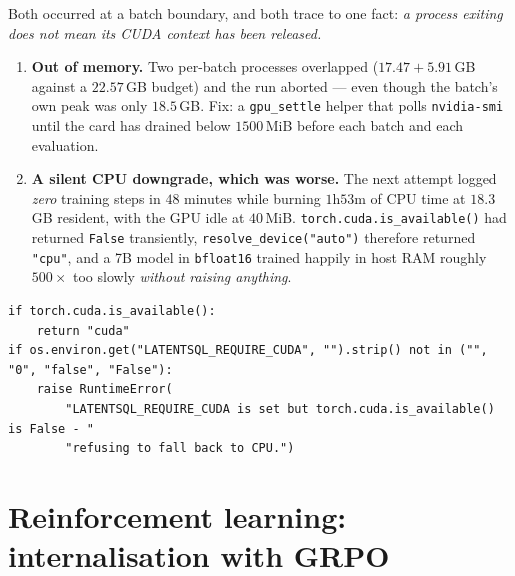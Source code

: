 \documentclass[11pt]{article}
\theoremstyle{definition}
\begin{document}
Both occurred at a batch boundary, and both trace to one fact: \emph{a process exiting does not mean its CUDA context has been released.}

\begin{enumerate}
\item \textbf{Out of memory.} Two per-batch processes overlapped ($17.47 + 5.91$\,GB against a $22.57$\,GB budget) and the run aborted --- even though the batch's own peak was only $18.5$\,GB. Fix: a \texttt{gpu\_settle} helper that polls \texttt{nvidia-smi} until the card has drained below $1500$\,MiB before each batch and each evaluation.

\item \textbf{A silent CPU downgrade, which was worse.} The next attempt logged \emph{zero} training steps in $48$ minutes while burning $1$h$53$m of CPU time at $18.3$\,GB resident, with the GPU idle at $40$\,MiB. \texttt{torch.cuda.is\_available()} had returned \texttt{False} transiently, \texttt{resolve\_device("auto")} therefore returned \texttt{"cpu"}, and a 7B model in \texttt{bfloat16} trained happily in host RAM roughly $500\times$ too slowly \emph{without raising anything}.
\end{enumerate}

\begin{center}
\end{center}

\begin{lstlisting}
if torch.cuda.is_available():
    return "cuda"
if os.environ.get("LATENTSQL_REQUIRE_CUDA", "").strip() not in ("", "0", "false", "False"):
    raise RuntimeError(
        "LATENTSQL_REQUIRE_CUDA is set but torch.cuda.is_available() is False - "
        "refusing to fall back to CPU.")
\end{lstlisting}

\newpage
\part{Reinforcement learning: internalisation with GRPO}
\label{part:grpo}
\end{document}
